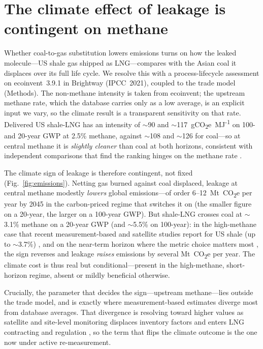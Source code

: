 \documentclass[sn-nature]{sn-jnl}
\theoremstyle{thmstyleone}%
\theoremstyle{thmstyletwo}%
\theoremstyle{thmstylethree}%
\begin{document}
\section*{The climate effect of leakage is contingent on methane}
Whether coal-to-gas substitution lowers emissions turns on how the leaked
molecule---US shale gas shipped as LNG---compares with the Asian coal it
displaces over its full life cycle. We resolve this with a process-lifecycle
assessment on ecoinvent~3.9.1 in Brightway (IPCC~2021), coupled to the trade
model (Methods). The non-methane intensity is taken from ecoinvent; the upstream
methane rate, which the database carries only as a low average, is an explicit
input we vary, so the climate result is a transparent sensitivity on that rate.
Delivered US shale-LNG has an intensity of $\sim$90 and
$\sim$117~gCO\textsubscript{2}e~MJ\textsuperscript{-1} on 100- and 20-year GWP at
2.5\% methane, against $\sim$108 and $\sim$126 for coal---so at central methane
it is \emph{slightly cleaner} than coal at both horizons, consistent with
independent comparisons that find the ranking hinges on the methane rate
\citep{Gordon2023}.

The climate sign of leakage is therefore contingent, not fixed
(Fig.~\ref{fig:emissions}). Netting gas burned against coal displaced, leakage
at central methane modestly \emph{lowers} global emissions---of order
6--12~Mt~CO\textsubscript{2}e per year by 2045 in the carbon-priced regime that
switches it on (the smaller figure on a 20-year, the larger on a 100-year GWP). But shale-LNG crosses coal at $\sim$3.1\% methane on a 20-year
GWP (and $\sim$5.5\% on 100-year): in the high-methane case that recent
measurement-based and satellite studies report for US shale (up to $\sim$3.7\%)
\citep{Sherwin2024, Rutherford2021, Karion2013, Miller2013, Peischl2015, Omara2022},
and on the near-term horizon where the metric choice matters most
\citep{Allen2018, Shindell2012}, the sign reverses and leakage \emph{raises}
emissions by several Mt~CO\textsubscript{2}e per year. The climate cost is thus
real but conditional---present in the high-methane, short-horizon regime, absent
or mildly beneficial otherwise.

Crucially, the parameter that decides the sign---upstream methane---lies outside
the trade model, and is exactly where measurement-based estimates diverge most
from database averages. That divergence is resolving toward higher values as
satellite and site-level monitoring displaces inventory factors and enters LNG
contracting and regulation \citep{ggr2025}, so the term that flips the climate
outcome is the one now under active re-measurement.
\end{document}
